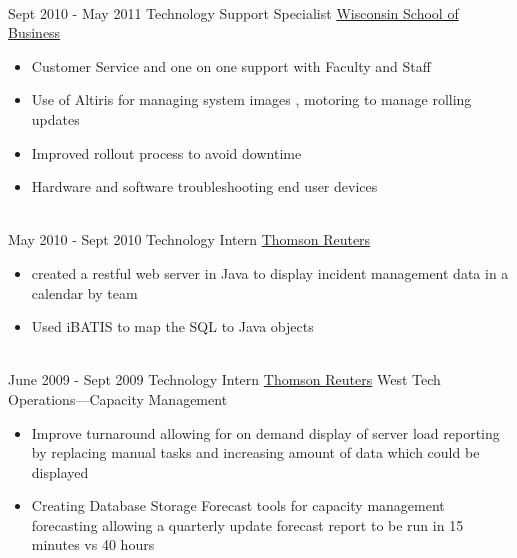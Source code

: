 \documentclass[letterpaper]{twentysecondcv} %
\begin{document}
\begin{twenty}
{{\begin{itemize}
    \end{itemize}}
        }
    \\   
    \twentyitem
   		{Sept 2010 -}
		{May 2011}
        {Technology Support Specialist}
        {\href{https://wsb.wisc.edu/}{Wisconsin School of Business}}
        {}
        {
        {\begin{itemize}
		\item Customer Service and one on one support with Faculty and Staff
		\item Use of Altiris for managing system images , motoring to manage rolling updates
		\item Improved rollout process to avoid downtime
		\item Hardware and software troubleshooting end user devices
    \end{itemize}}
        }
     \\
     \twentyitem
	    {May 2010 -}
	    {Sept 2010}
	   	{Technology Intern}
        {\href{https://www.thomsonreuters.com}{Thomson Reuters}}
        {}
        {
        \begin{itemize}
        \item created a restful web server in Java to display incident management data in a calendar by team 
        \item Used iBATIS to map the SQL to Java objects
        
    \end{itemize}
    	}
    \\
    \twentyitem
	   {June 2009 -}
	   {Sept 2009}
       {Technology Intern}
       {\href{https://www.thomsonreuters.com}{Thomson Reuters}}
       {West Tech Operations—Capacity Management}
       {
       	\begin{itemize}
       		\item Improve turnaround allowing for on demand display of server load reporting by replacing manual tasks and increasing amount of data which could be displayed
       		\item Creating Database Storage  Forecast tools for capacity management forecasting allowing a quarterly update forecast report to be run in 15 minutes vs 40 hours
       		
       	\end{itemize}
       } 
\end{twenty}
\end{document}
